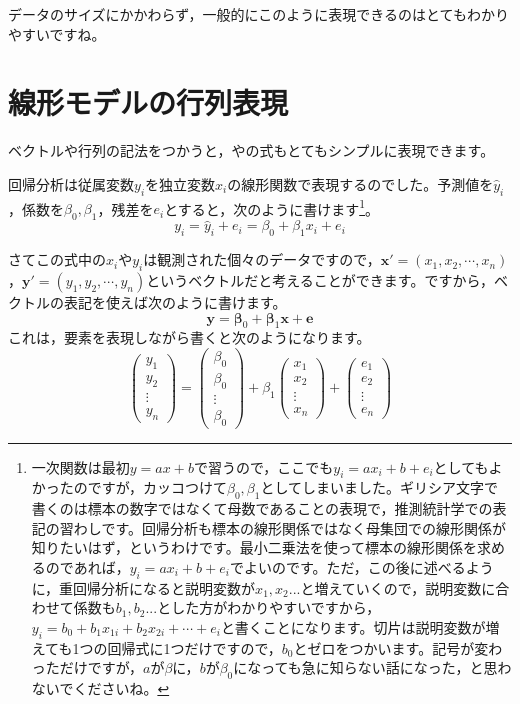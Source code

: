 \documentclass{ltjsbook}
\begin{document}
データのサイズにかかわらず，一般的にこのように表現できるのはとてもわかりやすいですね。

\section{線形モデルの行列表現}
\label{LinearModelForm}
ベクトルや行列の記法をつかうと，やの式もとてもシンプルに表現できます。

回帰分析は従属変数$y_i$を独立変数$x_i$の線形関数で表現するのでした。予測値を$\hat{y}_i$，係数を$\beta_0,\beta_1$，残差を$e_i$とすると，次のように書けます\footnote{一次関数は最初$y=ax+b$で習うので，ここでも$y_i = ax_i + b + e_i$としてもよかったのですが，カッコつけて$\beta_0,\beta_1$としてしまいました。ギリシア文字で書くのは標本の数字ではなくて母数であることの表現で，推測統計学での表記の習わしです。回帰分析も標本の線形関係ではなく母集団での線形関係が知りたいはず，というわけです。最小二乗法を使って標本の線形関係を求めるのであれば，$y_i = ax_i + b + e_i$でよいのです。ただ，この後に述べるように，重回帰分析になると説明変数が$x_1,x_2...$と増えていくので，説明変数に合わせて係数も$b_1,b_2...$とした方がわかりやすいですから，$y_i = b_0 + b_1 x_{1i} + b_2 x_{2i} + \cdots + e_i$と書くことになります。切片は説明変数が増えても1つの回帰式に1つだけですので，$b_0$とゼロをつかいます。記号が変わっただけですが，$a$が$\beta$に，$b$が$\beta_0$になっても急に知らない話になった，と思わないでくださいね。}。
\[y_i = \hat{y}_i + e_i = \beta_0 + \beta_1x_i + e_i\]

さてこの式中の$x_i$や$y_i$は観測された個々のデータですので，$\bm{x}'=(x_1,x_2,\cdots,x_n)$，$\bm{y}'=(y_1,y_2,\cdots,y_n)$というベクトルだと考えることができます。ですから，ベクトルの表記を使えば次のように書けます。
\[ \bm{y} = \bm{\beta}_0 + \bm{\beta}_1\bm{x} + \bm{e}\]
これは，要素を表現しながら書くと次のようになります。
\[
	\begin{pmatrix}
		y_1    \\
		y_2    \\
		\vdots \\
		y_n
	\end{pmatrix}
	=
	\begin{pmatrix}
		\beta_0 \\
		\beta_0 \\
		\vdots  \\
		\beta_0
	\end{pmatrix}
	+
	\beta_1
	\begin{pmatrix}
		x_1    \\
		x_2    \\
		\vdots \\
		x_n
	\end{pmatrix}
	+
	\begin{pmatrix}
		e_1    \\
		e_2    \\
		\vdots \\
		e_n
	\end{pmatrix}
\]
\end{document}
